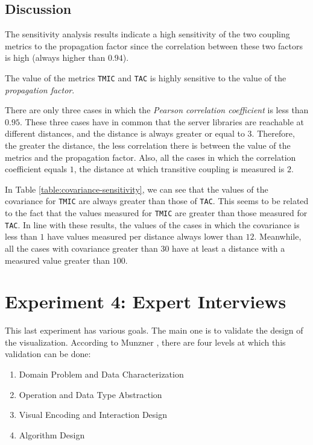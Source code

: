 \subsection{Discussion}
The sensitivity analysis results indicate a high sensitivity of the two coupling metrics to the propagation factor since the correlation between these two factors is high (always higher than $0.94$).

\begin{finding}
	The value of the metrics \texttt{TMIC} and \texttt{TAC} is highly sensitive to the value of the \textit{propagation factor}.
	\label{find:high-sensitivity}
\end{finding}

There are only three cases in which the \textit{Pearson correlation coefficient} is less than $0.95$. These three cases have in common that the server libraries are reachable at different distances, and the distance is always greater or equal to 3. Therefore, the greater the distance, the less correlation there is between the value of the metrics and the propagation factor. Also, all the cases in which the correlation coefficient equals $1$, the distance at which transitive coupling is measured is $2$.

In Table \ref{table:covariance-sensitivity}, we can see that the values of the covariance for \texttt{TMIC} are always greater than those of \texttt{TAC}. This seems to be related to the fact that the values measured for \texttt{TMIC} are greater than those measured for \texttt{TAC}. In line with these results, the values of the cases in which the covariance is less than $1$ have values measured per distance always lower than $12$. Meanwhile, all the cases with covariance greater than $30$ have at least a distance with a measured value greater than $100$.

\section{Experiment 4: Expert Interviews}
This last experiment has various goals. The main one is to validate the design of the visualization. According to Munzner \cite{Munzner2009}, there are four levels at which this validation can be done:

\begin{enumerate}
  \item Domain Problem and Data Characterization
  \item Operation and Data Type Abstraction
  \item Visual Encoding and Interaction Design
  \item Algorithm Design
\end{enumerate}

